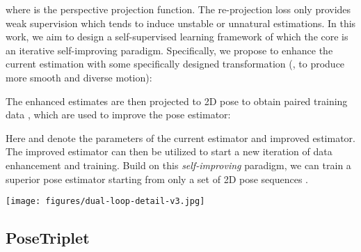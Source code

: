 \documentclass[10pt,twocolumn,letterpaper]{article}
\newcommand{\nameofmethod}{PoseTriplet}
\begin{document}
where  is the perspective projection function.
The re-projection loss only provides weak supervision which tends to induce unstable or unnatural estimations. In this work, we aim to design a self-supervised learning framework of which the core is an iterative self-improving paradigm. Specifically, we propose to enhance the current estimation with some specifically designed transformation  (\eg, to produce more smooth and diverse motion):

The enhanced estimates are then projected to 2D pose to obtain paired training data , which are used to improve the pose estimator:

Here  and  denote the parameters of the current estimator and improved estimator.
The improved estimator can then be utilized to start a new iteration of data enhancement and training.
Build on this \textit{self-improving} paradigm, we can train a superior pose estimator starting from only a set of 2D pose sequences .




\begin{figure*}[!t]
\centering
\texttt{[image: figures/dual-loop-detail-v3.jpg]}
\caption{\textbf{Detail of our \nameofmethod{} framework}. 
Given available 2D pose sequence , the pose estimator  transforms it to low-fidelity 3D pose sequence .
 is then served as semantic guidance signal (\ie, reference motion) for imitator  to obtain physically plausible motion .
The hallucinator  then generates novel and diverse motion  from  , which is then refined by the imitator  to obtain the final enhanced diverse and plausible motion .
 is then projected to 2D-3D pairs to train the estimator.
The improved estimator takes the available 2D pose sequence  and start another round of dual-loop optimization.
}
\vspace{-3mm}
\label{fig:overview}
\end{figure*}



\subsection{\nameofmethod{}}
\end{document}
